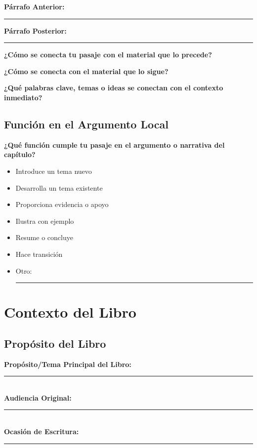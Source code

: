 \documentclass[11pt,a4paper]{article}
\begin{document}
\begin{contextbox}
\textbf{Párrafo Anterior:} \rule{4cm}{0.4pt} \textbf{Párrafo Posterior:} \rule{4cm}{0.4pt}
\end{contextbox}

\textbf{¿Cómo se conecta tu pasaje con el material que lo precede?}
\vspace{2cm}

\textbf{¿Cómo se conecta con el material que lo sigue?}
\vspace{2cm}

\textbf{¿Qué palabras clave, temas o ideas se conectan con el contexto inmediato?}
\vspace{2cm}

\subsection{Función en el Argumento Local}

\textbf{¿Qué función cumple tu pasaje en el argumento o narrativa del capítulo?}
\begin{itemize}[leftmargin=1cm]
    \item[$\square$] Introduce un tema nuevo
    \item[$\square$] Desarrolla un tema existente
    \item[$\square$] Proporciona evidencia o apoyo
    \item[$\square$] Ilustra con ejemplo
    \item[$\square$] Resume o concluye
    \item[$\square$] Hace transición
    \item[$\square$] Otro: \rule{6cm}{0.4pt}
\end{itemize}

\section{Contexto del Libro}

\subsection{Propósito del Libro}

\begin{canonbox}
\textbf{Propósito/Tema Principal del Libro:}\\[0.5cm]
\rule{12cm}{0.4pt}\\[0.5cm]
\textbf{Audiencia Original:} \rule{8cm}{0.4pt}\\[0.5cm]
\textbf{Ocasión de Escritura:} \rule{8cm}{0.4pt}
\end{canonbox}
\end{document}
